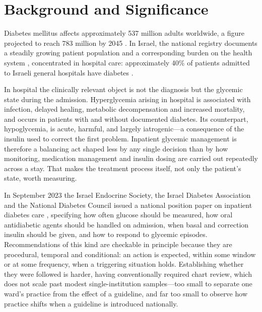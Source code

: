 \section{Background and Significance}
\label{sec:background}

Diabetes mellitus affects approximately 537 million adults worldwide, a figure
projected to reach 783 million by 2045 \citep{idf-atlas-10th-edition-2021}. In
Israel, the national registry documents a steadily growing patient population
and a corresponding burden on the health system
\citep{israel-national-center-disease-control-diabetes-registry-report-2012-2022,
summary-cost-diabetes-israel-2018}, concentrated in hospital care:
approximately 40\% of patients admitted to Israeli general hospitals have
diabetes \citep{hochberg2023inpatient}.

In hospital the clinically relevant object is not the diagnosis but the
glycemic state during the admission. Hyperglycemia arising in hospital is
associated with infection, delayed healing, metabolic decompensation and
increased mortality, and occurs in patients with and without documented
diabetes. Its counterpart, hypoglycemia, is acute, harmful, and largely
iatrogenic---a consequence of the insulin used to correct the first problem.
Inpatient glycemic management is therefore a balancing act shaped less by any
single decision than by how monitoring, medication management and insulin
dosing are carried out repeatedly across a stay. That makes the treatment
process itself, not only the patient's state, worth measuring.

In September 2023 the Israel Endocrine Society, the Israel Diabetes Association
and the National Diabetes Council issued a national position paper on inpatient
diabetes care \citep{hochberg2023inpatient}, specifying how often glucose
should be measured, how oral antidiabetic agents should be handled on
admission, when basal and correction insulin should be given, and how to
respond to glycemic episodes. Recommendations of this kind are checkable in
principle because they are procedural, temporal and conditional: an action is
expected, within some window or at some frequency, when a triggering situation
holds. Establishing whether they were followed is harder, having conventionally
required chart review, which does not scale past modest single-institution
samples---too small to separate one ward's practice from the effect of a
guideline, and far too small to observe how practice shifts when a guideline is
introduced nationally.

